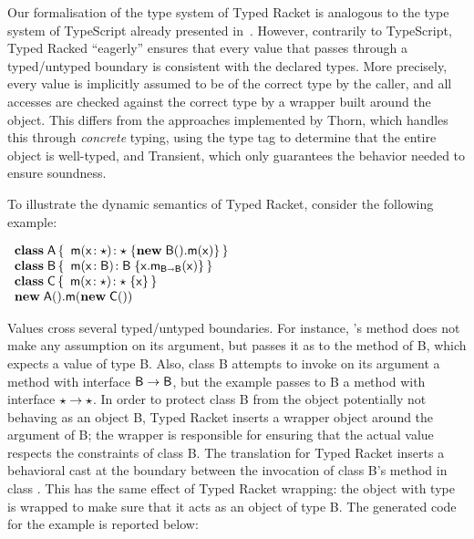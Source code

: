 \documentclass[acmlarge, anonymous, authordraft, review]{acmart} %
\begin{document}

Our formalisation of the type system of Typed Racket is analogous to the type system of TypeScript
already presented in~.  However, contrarily to TypeScript, 
Typed Racked ``eagerly'' ensures that every value that passes through a
typed/untyped boundary is consistent with the declared types.  More precisely, every value is implicitly assumed
to be of the correct type by the caller, and all accesses are checked against the correct type by
a wrapper built around the object.  This differs from the approaches implemented by Thorn, which handles
this through \emph{concrete} typing, using the type tag to determine that the
entire object is well-typed, and Transient, which only guarantees the behavior
needed to ensure soundness.  

To illustrate the dynamic semantics of Typed Racket, consider the  following example:

\smallskip
\(
  \begin{array}{l}
  \Class{\xt A}{}{\Mdef\m\x\any\any{{\Call{\New{\xt B}{}}\m{\x} }}} \\
  \Class{\xt B}{}{\Mdef\m\x{\xt B}{\xt B}{\KCall\x\m\x{\xt B}{\xt B}}} \\
  \Class{\C}{}{\Mdef\m\x{\any}{\any}{\x}} \\
  \Call{\New{\xt A}{}}\m{\New{\C}{}}
  \end{array}
\)
\smallskip

\noindent Values cross several typed/untyped boundaries.  For instance, \A's method \m does not make any assumption on its argument, but passes it as to the method \n of {\xt B}, which expects a value of type {\xt B}.  Also, class {\xt B} attempts to invoke on its argument a method \m with interface \({{\sf{B}}} \to {{\sf{B}}}\), but the example passes to {\xt B} a method \m with interface \(\star \to \star\).
In order to protect class {\xt B} from the object \C 
potentially not behaving as an object {\xt B}, Typed Racket inserts a wrapper object around the argument of {\xt B}; the wrapper is responsible for ensuring that the actual value respects the constraints of class {\xt B}.
The \kafka translation for Typed Racket inserts a behavioral 
cast at the boundary between the invocation of class {\xt B}'s method \m in class \A.  This has the same effect of Typed Racket wrapping: the object with type \C is wrapped to make sure that it acts as an object of type {\xt B}.
The generated \kafka code for the example is reported below:
\end{document}

